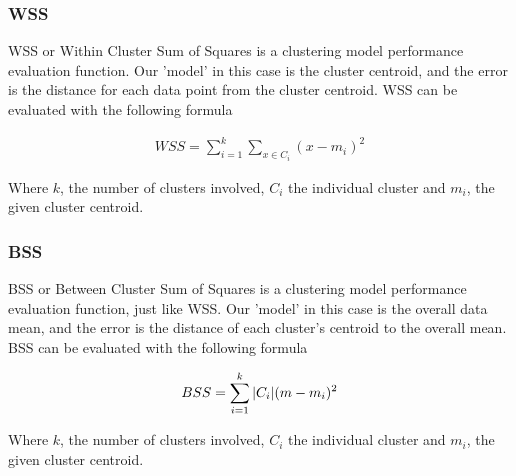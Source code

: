 \documentclass[11pt]{article}
\begin{document}
			\subsubsection*{WSS}
				WSS or  Within Cluster Sum of Squares is a clustering model performance evaluation function. Our 'model' in this case is the cluster centroid, and the error is the distance for each data point from the cluster centroid. WSS can be evaluated with the following formula\cite{sse}
				\iftrue
				\begin{align}
					WSS = \sum_{i=1}^{k}{\sum_{x\in{C_i}}^{}{(x-m_i)^2}}	
				\end{align}
				\fi
				Where $k$, the number of clusters involved, $C_i$ the individual cluster and $m_i$, the given cluster centroid.
				\subsubsection*{BSS}
				BSS or  Between Cluster Sum of Squares is a clustering model performance evaluation function, just like WSS. Our 'model' in this case is the overall data mean, and the error is the distance of each cluster's centroid to the overall mean. BSS can be evaluated with the following formula\cite{sse}
				\iftrue
				\begin{align}
					BSS = \sum_{i=1}^{k}{\abs{C_i}(m-m_i)^2}	
				\end{align}
				\fi
				Where $k$, the number of clusters involved, $C_i$ the individual cluster and $m_i$, the given cluster centroid.
\end{document}
